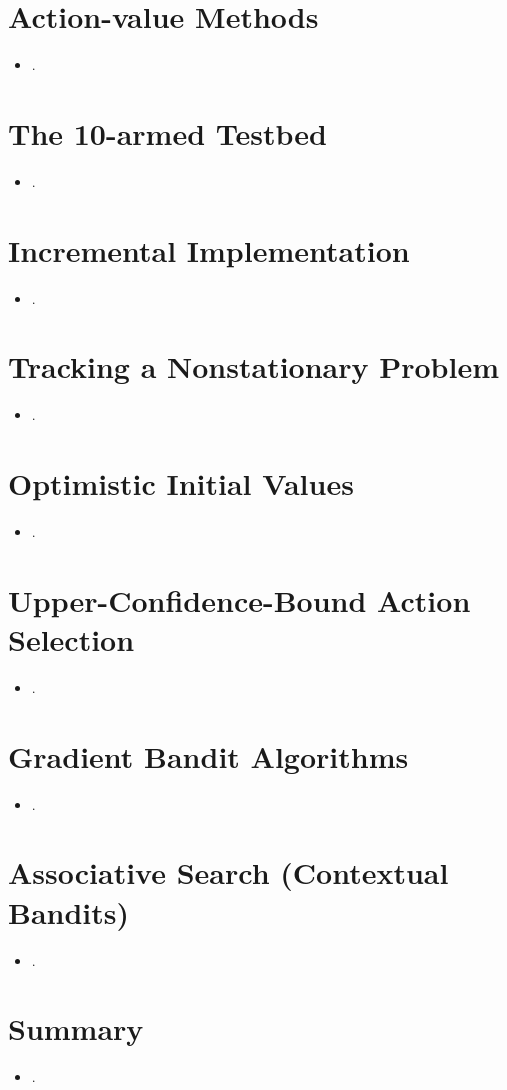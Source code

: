 \documentclass{article}
\begin{document}
\section{Action-value Methods}
\begin{itemize}
    \item .
\end{itemize}

\section{The 10-armed Testbed}
\begin{itemize}
    \item .
\end{itemize}

\section{Incremental Implementation}
\begin{itemize}
    \item .
\end{itemize}

\section{Tracking a Nonstationary Problem}
\begin{itemize}
    \item .
\end{itemize}

\section{Optimistic Initial Values}
\begin{itemize}
    \item .
\end{itemize}

\section{Upper-Confidence-Bound Action Selection}
\begin{itemize}
    \item .
\end{itemize}

\section{Gradient Bandit Algorithms}
\begin{itemize}
    \item .
\end{itemize}

\section{Associative Search (Contextual Bandits)}
\begin{itemize}
    \item .
\end{itemize}

\section{Summary}
\begin{itemize}
    \item .
\end{itemize}
\end{document}
